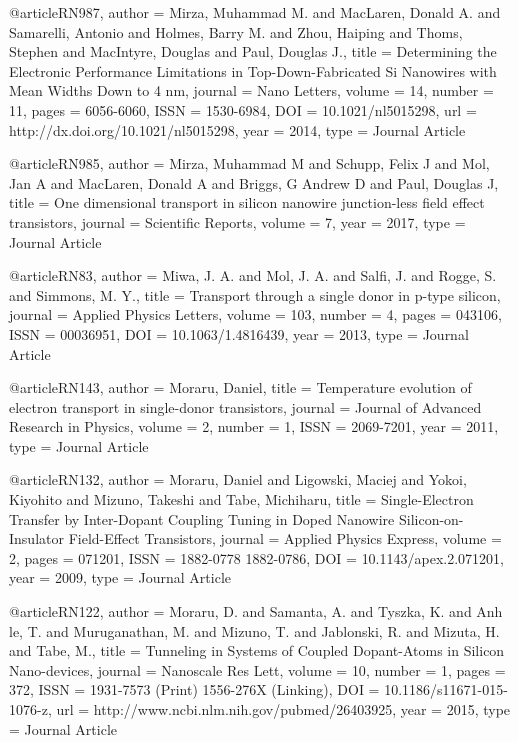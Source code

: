 @article{RN987,
   author = {Mirza, Muhammad M. and MacLaren, Donald A. and Samarelli, Antonio and Holmes, Barry M. and Zhou, Haiping and Thoms, Stephen and MacIntyre, Douglas and Paul, Douglas J.},
   title = {Determining the Electronic Performance Limitations in Top-Down-Fabricated Si Nanowires with Mean Widths Down to 4 nm},
   journal = {Nano Letters},
   volume = {14},
   number = {11},
   pages = {6056-6060},
   ISSN = {1530-6984},
   DOI = {10.1021/nl5015298},
   url = {http://dx.doi.org/10.1021/nl5015298},
   year = {2014},
   type = {Journal Article}
}

@article{RN985,
   author = {Mirza, Muhammad M and Schupp, Felix J and Mol, Jan A and MacLaren, Donald A and Briggs, G Andrew D and Paul, Douglas J},
   title = {One dimensional transport in silicon nanowire junction-less field effect transistors},
   journal = {Scientific Reports},
   volume = {7},
   year = {2017},
   type = {Journal Article}
}

@article{RN83,
   author = {Miwa, J. A. and Mol, J. A. and Salfi, J. and Rogge, S. and Simmons, M. Y.},
   title = {Transport through a single donor in p-type silicon},
   journal = {Applied Physics Letters},
   volume = {103},
   number = {4},
   pages = {043106},
   ISSN = {00036951},
   DOI = {10.1063/1.4816439},
   year = {2013},
   type = {Journal Article}
}

@article{RN143,
   author = {Moraru, Daniel},
   title = {Temperature evolution of electron transport in single-donor transistors},
   journal = {Journal of Advanced Research in Physics},
   volume = {2},
   number = {1},
   ISSN = {2069-7201},
   year = {2011},
   type = {Journal Article}
}

@article{RN132,
   author = {Moraru, Daniel and Ligowski, Maciej and Yokoi, Kiyohito and Mizuno, Takeshi and Tabe, Michiharu},
   title = {Single-Electron Transfer by Inter-Dopant Coupling Tuning in Doped Nanowire Silicon-on-Insulator Field-Effect Transistors},
   journal = {Applied Physics Express},
   volume = {2},
   pages = {071201},
   ISSN = {1882-0778
1882-0786},
   DOI = {10.1143/apex.2.071201},
   year = {2009},
   type = {Journal Article}
}

@article{RN122,
   author = {Moraru, D. and Samanta, A. and Tyszka, K. and Anh le, T. and Muruganathan, M. and Mizuno, T. and Jablonski, R. and Mizuta, H. and Tabe, M.},
   title = {Tunneling in Systems of Coupled Dopant-Atoms in Silicon Nano-devices},
   journal = {Nanoscale Res Lett},
   volume = {10},
   number = {1},
   pages = {372},
   ISSN = {1931-7573 (Print)
1556-276X (Linking)},
   DOI = {10.1186/s11671-015-1076-z},
   url = {http://www.ncbi.nlm.nih.gov/pubmed/26403925},
   year = {2015},
   type = {Journal Article}
}

